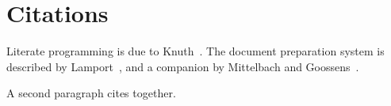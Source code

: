 \documentclass{article}
\begin{document}
\section{Citations}
Literate programming is due to Knuth~\cite{knuth84}. The document
preparation system is described by Lamport~\cite{lamport94}, and a
companion by Mittelbach and Goossens~\cite{mittelbach04}.

A second paragraph cites \cite{knuth84,lamport94} together.


\end{document}
